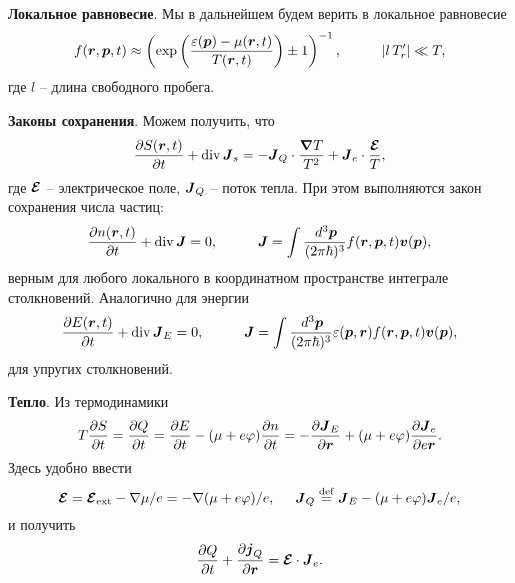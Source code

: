 
\textbf{Локальное равновесие}.
Мы в дальнейшем будем верить в локальное равновесие
\begin{equation*}
	f(\vc{r}, \vc{p}, t) \approx \left(
	 \exp \left(\frac{\varepsilon(\vc{p})-\mu(\vc{r}, t)}{T(\vc{r}, t)}\right) \pm 1
	\right)^{-1},
	\hspace{10 mm} 
	|l \, T_r'| \ll T,
\end{equation*}
где $l$ -- длина свободного пробега.


\textbf{Законы сохранения}.
Можем получить, что
\begin{equation*}
	\frac{\partial S(\boldsymbol{r}, t)}{\partial t} + \mathop{\mathrm{div}}\nolimits \boldsymbol{J}_s = - \boldsymbol{J}_Q \cdot \frac{\boldsymbol{\nabla} T}{T^2} + \boldsymbol{J}_e \cdot \frac{\boldsymbol{\mathcal E}}{T},
\end{equation*}
где $\boldsymbol{\mathcal E}$ -- электрическое поле, $\boldsymbol{J}_Q$ -- поток тепла. При этом выполняются закон сохранения числа частиц:
\begin{equation*}
	\frac{\partial n(\vc{r}, t)}{\partial t} + \div \vc{J} = 0,
	\hspace{10 mm} 
	\vc{J} = \int \frac{\d^3 \vc{p}}{(2\pi \hbar)^3} f(\vc{r}, \vc{p}, t) \vc{v}(\vc{p}),
\end{equation*}
верным для любого локального в координатном пространстве интеграле столкновений. Аналогично для энергии
\begin{equation*}
	\frac{\partial E(\vc{r}, t)}{\partial t} + \div \vc{J}_E = 0,
	\hspace{10 mm} 
	\vc{J} = \int \frac{\d^3 \vc{p}}{(2\pi \hbar)^3} \varepsilon(\vc{p}, \vc{r}) f(\vc{r}, \vc{p}, t) \vc{v}(\vc{p}),
\end{equation*}
для упругих столкновений.


\textbf{Тепло}. Из термодинамики
\begin{equation*}
	T \frac{\partial S}{\partial t} = \frac{\partial Q}{\partial t} = \frac{\partial E}{\partial t} - (\mu + e \varphi) \frac{\partial n}{\partial t} = - \frac{\partial \boldsymbol{J}_E}{\partial \boldsymbol{r}} + (\mu + e \varphi) \frac{\partial \boldsymbol{J}_e}{\partial e \boldsymbol{r}}.
\end{equation*}
Здесь удобно ввести
\begin{equation*}
	\boldsymbol{\mathcal E} = \boldsymbol{\mathcal E}_{\textnormal{ext}} - \nabla \mu / e = - \nabla (\mu + e \varphi) / e,
	\hspace{5 mm} 
	\boldsymbol{J}_Q \overset{\mathrm{def}}{=} \boldsymbol{J}_E - (\mu + e \varphi) \boldsymbol{J}_e / e,
\end{equation*}
и получить 
\begin{equation*}
	\frac{\partial Q}{\partial t} + \frac{\partial \boldsymbol{j}_Q}{\partial \boldsymbol{r}} = \boldsymbol{\mathcal E} \cdot \boldsymbol{J}_e. 
\end{equation*}

